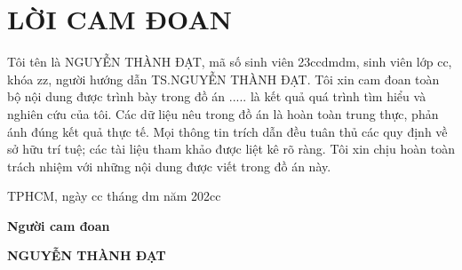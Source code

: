 \thispagestyle{empty}
\section*{LỜI CAM ĐOAN}
Tôi tên là NGUYỄN THÀNH ĐẠT, mã số sinh viên 23ccdmdm, sinh viên lớp cc, khóa zz, người hướng dẫn TS.NGUYỄN THÀNH ĐẠT. Tôi xin cam đoan toàn bộ nội dung được trình bày trong đồ án ..... là kết quả quá trình tìm hiểu và nghiên cứu của tôi. Các dữ liệu nêu trong đồ án là hoàn toàn trung thực, phản ánh đúng kết quả thực tế. Mọi thông tin trích dẫn đều tuân thủ các quy định về sở hữu trí tuệ; các tài liệu tham khảo được liệt kê rõ ràng. Tôi xin chịu hoàn toàn trách nhiệm với những nội dung được viết trong đồ án này.

\vspace{6pt}
\hspace{7cm}TPHCM, ngày cc tháng dm năm 202cc

\hspace{9cm}\textbf{Người cam đoan}

\vspace{2cm}
\hspace{8.65cm}\textbf{NGUYỄN THÀNH ĐẠT}